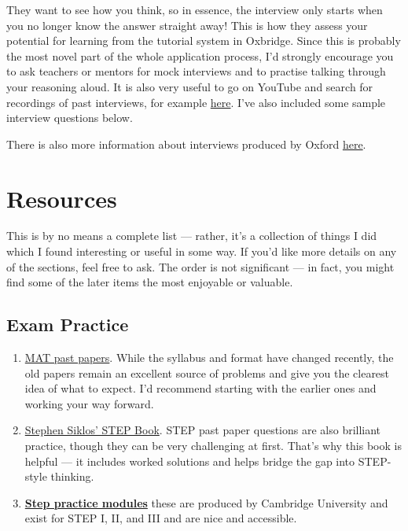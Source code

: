 \documentclass[11pt]{article}
\newif\ifshowcomments
\newcommand{\comment}[1]{\ifshowcomments\textcolor{myblue}{\textbf{#1}}\fi}
\begin{document}
They want to see how you think, so in essence, the interview only starts when you no longer know the answer straight away! This is how they assess your potential for learning from the tutorial system in Oxbridge.  Since this is probably the most novel part of the whole application process, I’d strongly encourage you to ask teachers or mentors for mock interviews and to practise talking through your reasoning aloud. It is also very useful to go on YouTube and search for recordings of past interviews, for example \href{https://www.youtube.com/watch?v=lcFMcohMcVQ}{here}. I've also included some sample interview questions below.

\comment{You are already very good at talking through your thinking, so just keep doing what you're doing!}

There is also more information about interviews produced by Oxford \href{https://www.ox.ac.uk/admissions/undergraduate/applying-to-oxford/guide/interviews}{here}.

\section{Resources}

This is by no means a complete list — rather, it’s a collection of things I did which I found interesting or useful in some way. If you'd like more details on any of the sections, feel free to ask. The order is not significant — in fact, you might find some of the later items the most enjoyable or valuable.

\subsection{Exam Practice}

\begin{enumerate}
\item \href{https://www.maths.ox.ac.uk/study-here/undergraduate-study/maths-admissions-test}{MAT past papers}. While the syllabus and format have changed recently, the old papers remain an excellent source of problems and give you the clearest idea of what to expect. I’d recommend starting with the earlier ones and working your way forward.

\item \href{https://www.colmanweb.co.uk/Assets/PDF/advanced-problems-mathematics.pdf}{Stephen Siklos' STEP Book}. STEP past paper questions are also brilliant practice, though they can be very challenging at first. That’s why this book is helpful — it includes worked solutions and helps bridge the gap into STEP-style thinking.


\item \href{https://maths.org/step/assignments-stepiii}{\textbf{Step practice modules}} these are produced by Cambridge University and exist for STEP I, II, and III and are nice and accessible.
\end{enumerate}
\end{document}
